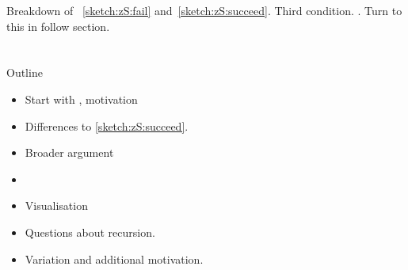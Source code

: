 \begin{note}
  Breakdown of ~\ref{sketch:zS:fail} and~\ref{sketch:zS:succeed}.
  Third condition.
  .
  Turn to this in follow section.
\end{note}

\section{\zS{}}
\label{cha:zS:sec:question}

\begin{note}[Outline]
  Outline
  \begin{itemize}
  \item
    Start with \qzS{}, motivation
  \item
    Differences to \autoref{sketch:zS:succeed}.
  \item
    Broader argument
  \item
  \item
    Visualisation
  \item
    Questions about recursion.
  \item
    Variation and additional motivation.
  \end{itemize}
\end{note}

